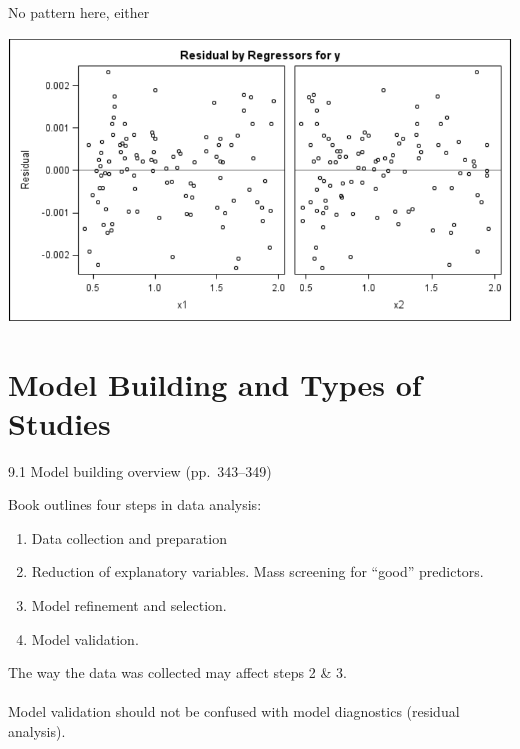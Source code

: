 \documentclass{beamer}
\begin{document}
\begin{frame}{No pattern here, either}
\centerline{\includegraphics[scale=0.25]{plots/yvsy}}
\end{frame}

\section{Model Building and Types of Studies}

\begin{frame}{9.1 Model building overview (pp.~343--349)}

Book outlines four steps in data analysis:
\begin{enumerate}
\item Data collection and preparation  
\item \pause Reduction of explanatory variables. Mass screening for ``good'' predictors.
\item \pause Model refinement and selection.
\item \pause Model validation.
\end{enumerate}
\vspace{20pt}

\pause The way the data was collected may affect steps 2 \& 3.\\~\\
\pause Model validation should not be confused with model diagnostics (residual analysis).
\end{frame}
\end{document}
